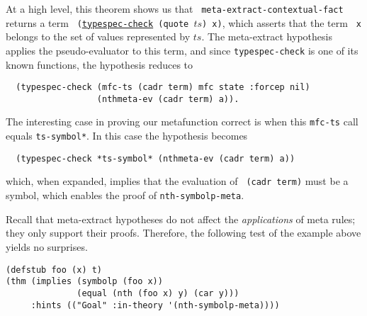 \noindent At a high level, this theorem shows us that {\tt
  meta-extract-contextual-fact} returns a term {\tt
  (\href{http://www.cs.utexas.edu/users/moore/acl2/manuals/current/manual/index.html?topic=ACL2\_\_\_\_TYPESPEC-CHECK}{\underline{typespec-check}} (quote $ts$) x)}, which asserts that the term {\tt
  x} belongs to the set of values represented by $ts$.  The
meta-extract hypothesis applies the pseudo-evaluator to this term, and
since {\tt typespec-\allowbreak{}check} is one of its known functions, the
hypothesis reduces to
\begin{verbatim}
  (typespec-check (mfc-ts (cadr term) mfc state :forcep nil)
                  (nthmeta-ev (cadr term) a)).
\end{verbatim}
\noindent The interesting case in proving our metafunction correct is
when this {\tt mfc-ts} call equals {\tt *ts-symbol*}.  In this case the hypothesis becomes
\begin{verbatim}
  (typespec-check *ts-symbol* (nthmeta-ev (cadr term) a))
\end{verbatim}
\noindent which, when expanded, implies that the evaluation of {\tt
  (cadr term)} must be a
symbol, which enables the proof of {\tt nth-symbolp-meta}.

\begin{comment}
  Do we need to discuss the application of the meta rule?  As
  indicated in the introduction, nothing about the application of
  metafunctions or clause processors has changed.

  [Matt] Excellent point.  I've made this much shorter and explained
  that it's just business as usual, since I think that's worth
  emphasizing.  But if you want to delete all of it, please feel free;
  in particular, we should delete it without a moment's thought if we
  need the space.
\end{comment}

Recall that meta-extract hypotheses do not affect the {\em
  applications} of meta rules; they only support their proofs.
Therefore, the following test of the example above yields no surprises.

\begin{verbatim}
(defstub foo (x) t)
(thm (implies (symbolp (foo x))
              (equal (nth (foo x) y) (car y)))
     :hints (("Goal" :in-theory '(nth-symbolp-meta))))
\end{verbatim}


